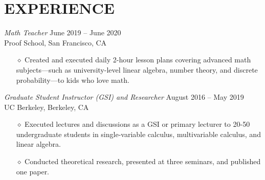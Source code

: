 \documentclass{simplecv}
\begin{document}
\section{EXPERIENCE}
{\sl Math Teacher} \hfill June 2019 -- June 2020 \\
Proof School, San Francisco, CA
\begin{itemize}
  \item[$\diamond$] Created and executed daily 2-hour lesson plans covering advanced math subjects---such as university-level linear algebra, number theory, and discrete probability---to kids who love math.
\end{itemize}
{\sl Graduate Student Instructor (GSI) and Researcher} \hfill August 2016 -- May 2019 \\
UC Berkeley, Berkeley, CA
\begin{itemize}
  \item[$\diamond$] Executed lectures and discussions as a GSI or primary lecturer to 20-50 undergraduate students in single-variable calculus, multivariable calculus, and linear algebra.
  \item[$\diamond$] Conducted theoretical research, presented at three seminars, and published one paper.
\end{itemize}
\end{document}
